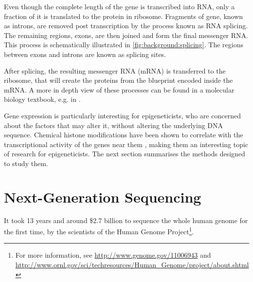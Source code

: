 \documentclass[parskip]{cs4rep}
\begin{document}
Even though the complete length of the gene is transcribed into RNA, only a fraction of it is translated to the protein in ribosome. Fragments of gene, known as introns, are removed post transcription by the process known as RNA splicing. The remaining regions, exons, are then joined and form the final messenger RNA. This process is schematically illustrated in \autoref{fig:background:splicing}. The regions between exons and introns are known as splicing sites. 

After splicing, the resulting messenger RNA (mRNA) is transferred to the ribosome, that will create the proteins from the blueprint encoded inside the mRNA. A more in depth view of these processes can be found in a molecular biology textbook, e.g. in \cite{Alberts:2002te}.

Gene expression is particularly interesting for epigeneticists, who are concerned about the factors that may alter it, without altering the underlying DNA sequence. Chemical histone modifications have been shown to correlate with the transcriptional activity of the genes near them \cite{Pokholok:2005wn,Kouzarides:2007js}, making them an interesting topic of research for epigeneticists. The next section summarises the methods designed to study them. 
 
\section{Next-Generation Sequencing}

It took 13 years and around \$2.7 billion to sequence the whole human genome for the first time, by the scientists of the Human Genome Project\footnote{For more information, see \url{http://www.genome.gov/11006943} and
    \url{http://www.ornl.gov/sci/techresources/Human_Genome/project/about.shtml}}. 
    
\end{document}

